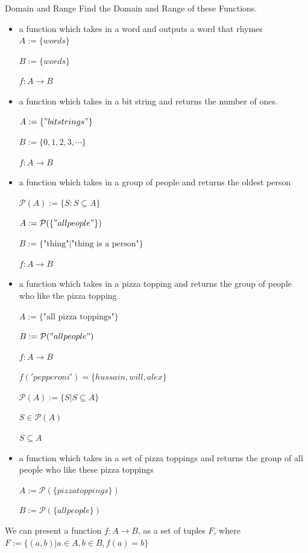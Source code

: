 \newpage
\begin{exmp}{Domain and Range}
Find the Domain and Range of these Functions. 

\begin{itemize}
\item a function which takes in a word and outputs a word that rhymes
\newline
$A:=\{words \}$

$B:=\{ words\}$

$f:A\to B$

\item a function which takes in a bit string and returns the number of ones.

$A:=\{"bit strings" \}$

$B:=\{0, 1, 2, 3, \cdots \}$

$f:A\to B$

\item a function which takes in a group of people and returns the oldest person

$\mathcal{P}(A):=\{S: S\subseteq A\}$

$A:=\mathcal{P}(\{"all people"\})$

$B:=\{\text{"thing"} | \text{"thing is a person"}\}$

$f:A\to B$

\item a function which takes in a pizza topping and returns the group of people who like the pizza topping

$A:=\{\text{"all pizza toppings"}\}$

$B:=\mathcal{P}("all people")$

$f:A\to B$

$f('pepperoni')=\{hussain, will, alex \}$

$\mathcal{P}(A):=\{S |S\subseteq A\}$

$S \in \mathcal{P}(A)$

$S \subseteq A$

\item a function which takes in a set of pizza toppings and returns the group of all people who like these pizza toppings

$A:=\mathcal{P}(\{pizza toppings\})$

$B:=\mathcal{P}(\{all people\})$


\end{itemize}
\end{exmp}
\begin{defn}
We can present a function $f:A\to B$, as a set of tuples $F$, where $F:=\{(a,b)| a\in A, b \in B, f(a)=b\}$
\end{defn}

